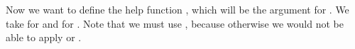 Now we want to define the help function , which will be the argument for .
We take  for  and  for .
Note that we must use , because otherwise we would not be able to apply  or .

\begin{code}%
\>[0]\AgdaSpace{}%
\AgdaSymbol{:}\AgdaSpace{}%
\AgdaSymbol{(}\AgdaSpace{}%
\AgdaSpace{}%
\AgdaSpace{}%
\AgdaSymbol{(}\AgdaSpace{}%
\AgdaSymbol{)}\AgdaSpace{}%
\AgdaSpace{}%
\AgdaSymbol{(}\AgdaSymbol{(}\AgdaSpace{}%
\AgdaSymbol{))}\AgdaSpace{}%
\AgdaSpace{}%
\AgdaSpace{}%
\AgdaSymbol{)}\<%
\\
\>[0]\AgdaSpace{}%
\AgdaSymbol{(}\AgdaSpace{}%
\AgdaSpace{}%
\AgdaOperator{\AgdaInductiveConstructor{,}}\AgdaSpace{}%
\AgdaSymbol{)}\AgdaSpace{}%
\AgdaSymbol{=}\AgdaSpace{}%
\AgdaSymbol{(}\AgdaSpace{}%
\AgdaSpace{}%
\AgdaOperator{\AgdaInductiveConstructor{,}}\AgdaSpace{}%
\AgdaSymbol{)}\<%
\\
\>[0]\AgdaSpace{}%
\AgdaSymbol{(}\AgdaSpace{}%
\AgdaSpace{}%
\AgdaSpace{}%
\AgdaOperator{\AgdaInductiveConstructor{,}}\AgdaSpace{}%
\AgdaSymbol{)}\AgdaSpace{}%
\AgdaSymbol{=}\<%
\\
\>[0][@{}l@{\AgdaIndent{0}}]%
\>[2]%
\>[373I]\AgdaSymbol{(}\AgdaSpace{}%
\AgdaOperator{\AgdaInductiveConstructor{,}}\AgdaSpace{}%
\AgdaSymbol{)}\AgdaSpace{}%
\AgdaSymbol{=}\AgdaSpace{}%
\AgdaSpace{}%
\AgdaSymbol{(}\AgdaSpace{}%
\AgdaOperator{\AgdaInductiveConstructor{,}}\AgdaSpace{}%
\AgdaSymbol{)}\<%
\\
\>[.]\<[373I]%
\>[6]\AgdaSymbol{(}\AgdaSpace{}%
\AgdaOperator{\AgdaInductiveConstructor{,}}\AgdaSpace{}%
\AgdaSymbol{)}\AgdaSpace{}%
\AgdaSymbol{=}\AgdaSpace{}%
\AgdaSpace{}%
\AgdaSymbol{(}\AgdaSpace{}%
\AgdaOperator{\AgdaInductiveConstructor{,}}\AgdaSpace{}%
\AgdaSymbol{)}\<%
\\
%
\>[2]\AgdaSpace{}%

\end{code}
